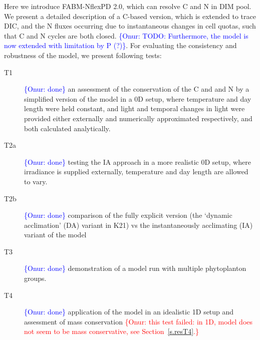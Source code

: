 \documentclass[gmd, manuscript]{copernicus}
\newcommand{\onur}[1]{\textcolor{blue}{\{Onur: #1\}}}
\begin{document}
Here we introduce FABM-NflexPD 2.0, which can resolve C and N in DIM pool. We present a detailed description of a C-based version, which is extended to trace DIC, and the N fluxes occurring due to instantaneous changes in cell quotas, such that C and N cycles are both closed. \onur{TODO: Furthermore, the model is now extended with limitation by P (?)}. For evaluating the consistency and robustness of the model, we present following tests:
\begin{description}
 \item [T1] \onur{done} an assessment of the conservation of the C and and N by a simplified version of the model in a 0D setup, where temperature and day length were held constant, and light and temporal changes in light were provided either externally and numerically approximated respectively, and both calculated analytically.
 \item [T2a] \onur{done} testing the IA approach in a more realistic 0D setup, where irradiance is supplied externally, temperature and day length are allowed to vary. %
 \item [T2b] \onur{done} comparison of the fully explicit version (the `dynamic acclimation' (DA) variant in K21) vs the instantaneously acclimating (IA) variant of the model 
 \item [T3] \onur{done} demonstration of a model run with multiple phytoplanton groups.
 \item [T4] \onur{done} application of the model in an idealistic 1D setup and assessment of mass conservation \textcolor{red}{\{Onur: this test failed: in 1D, model does not seem to be mass conservative, see Section~\ref{s.resT4}.\}} 
\end{description}

\end{document}

